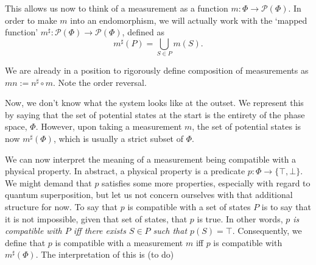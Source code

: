 \documentclass{article}
\theoremstyle{definition}
\newcommand{\ps}{\mathcal{P}}
\begin{document}
This allows us now to think of a measurement as a function $m : \Phi \to \ps(\Phi)$. In order to make $m$ into an endomorphism, we will actually work with the `mapped function' $m^\sharp : \ps(\Phi) \to \ps(\Phi)$, defined as
\[m^\sharp(P) = \bigcup_{S \in P} m(S).\]

We are already in a position to rigorously define composition of measurements as $mn := n^\sharp \circ m$. Note the order reversal.

Now, we don't know what the system looks like at the outset. We represent this by saying that the set of potential states at the start is the entirety of the phase space, $\Phi$. However, upon taking a measurement $m$, the set of potential states is now $m^\sharp(\Phi)$, which is usually a strict subset of $\Phi$.

We can now interpret the meaning of a measurement being compatible with a physical property. In abstract, a physical property is a predicate $p : \Phi \to \{\top, \bot\}$. We might demand that $p$ satisfies some more properties, especially with regard to quantum superposition, but let us not concern ourselves with that additional structure for now. To say that $p$ is compatible with a set of states $P$ is to say that it is not impossible, given that set of states, that $p$ is true. In other words, \emph{$p$ is compatible with $P$ iff there exists $S \in P$ such that $p(S) = \top$}. Consequently, we define that $p$ is compatible with a measurement $m$ iff $p$ is compatible with $m^\sharp(\Phi)$. The interpretation of this is (to do)

{}

\end{document}

